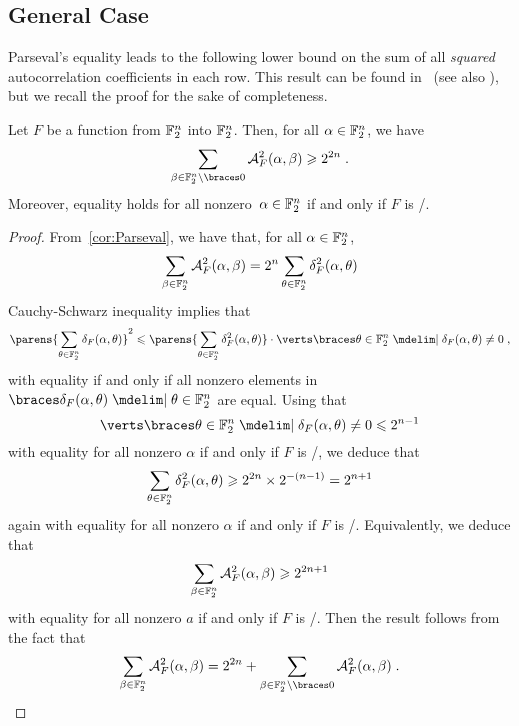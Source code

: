 \subsection{General Case}

Parseval's equality leads to the following lower bound on the sum of all \emph{squared} autocorrelation coefficients in each row.
This result can be found in~\cite{FSE:Nyberg94} (see also \cite[Theorem~2]{TIT:BCCL06}), but we recall the proof for the sake of completeness.
\begin{proposition}\label{prop:boundAPN}
    Let $F$ be a function from $\mathbb{F}_2^n$ into $\mathbb{F}_2^n$.
    Then, for all $\alpha \in \mathbb{F}_2^n$, we have
    \begin{equation*}
        \sum_{\beta \in \F_2^n \setminus \set{0}} \AC{F}^2(\alpha, \beta) \geqslant 2^{2n}\;.
    \end{equation*}
    Moreover, equality holds for all nonzero~$\alpha \in \mathbb{F}_2^n$ if and only if $F$ is \APN/.
\end{proposition}
\begin{proof}
    From~\cref{cor:Parseval}, we have that, for all $\alpha \in \mathbb{F}_2^n$,
    \begin{equation*}
        \sum_{\beta \in \mathbb{F}_2^n} \mathcal{A}_{F}^2(\alpha, \beta) = 2^n \sum_{\theta \in \mathbb{F}_2^n} \delta_{F}^2(\alpha, \theta)
    \end{equation*}
    Cauchy-Schwarz inequality implies that
    \begin{equation*}
        \parens{\sum_{\theta \in \F_2^n} \DC{F}(\alpha, \theta)}^2 \leqslant \parens{\sum_{\theta \in \F_2^n} \DC{F}^2(\alpha, \theta)} \cdot \abs{\set{\theta \in \F_2^n \given \DC{F}(\alpha, \theta) \neq 0}}\;,
    \end{equation*}
    with equality if and only if all nonzero elements in $\set{\DC{F}(\alpha, \theta) \given \theta \in \F_2^n}$ are equal.
    Using that
    \begin{equation*}
        \abs{\set{\theta \in \F_2^n \given \DC{F}(\alpha, \theta) \neq 0}} \leqslant 2^{n-1}
    \end{equation*}
    with equality for all nonzero $\alpha$ if and only if $F$ is \APN/, we deduce that
    \begin{equation*}
        \sum_{\theta \in \mathbb{F}_2^n} \delta_{F}^2(\alpha, \theta) \geqslant 2^{2n} \times 2^{-(n-1)} = 2^{n+1}
    \end{equation*}
    again with equality for all nonzero $\alpha$ if and only if $F$ is \APN/.
    Equivalently, we deduce that
    \begin{equation*}
        \sum_{\beta \in \mathbb{F}_2^n} \mathcal{A}_{F}^2(\alpha, \beta) \geqslant 2^{2n+1}
    \end{equation*}
    with equality for all nonzero $a$ if and only if $F$ is \APN/.
    Then the result follows from the fact that
    \begin{equation*}
        \sum_{\beta \in \F_2^n} \AC{F}^2(\alpha, \beta) = 2^{2n} + \sum_{\beta \in \F_2^n \setminus \set{0}} \AC{F}^2(\alpha, \beta)\;.
    \end{equation*}
\end{proof}

